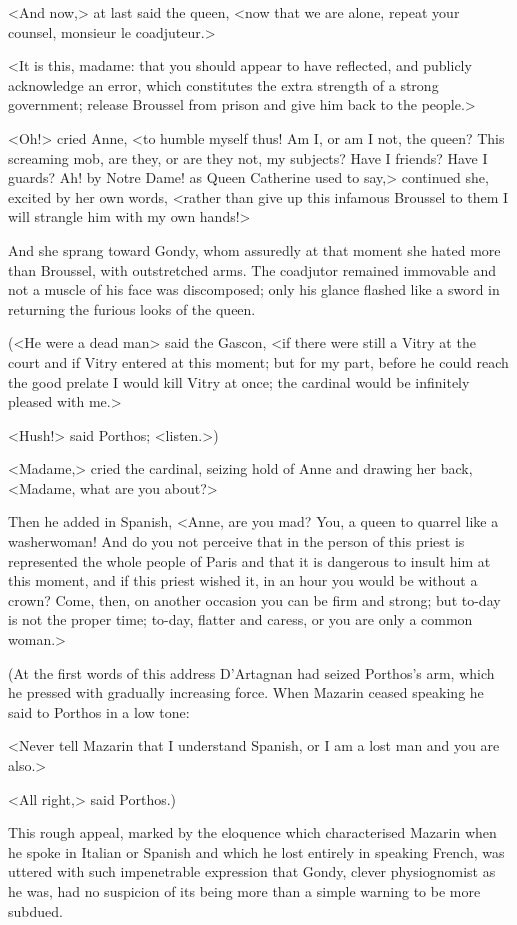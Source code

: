 <And now,> at last said the queen, <now that we are alone, repeat your counsel, monsieur le coadjuteur.>

<It is this, madame: that you should appear to have reflected, and publicly acknowledge an error, which constitutes the extra strength of a strong government; release Broussel from prison and give him back to the people.>

<Oh!> cried Anne, <to humble myself thus! Am I, or am I not, the queen? This screaming mob, are they, or are they not, my subjects? Have I friends? Have I guards? Ah! by Notre Dame! as Queen Catherine used to say,> continued she, excited by her own words, <rather than give up this infamous Broussel to them I will strangle him with my own hands!>

And she sprang toward Gondy, whom assuredly at that moment she hated more than Broussel, with outstretched arms. The coadjutor remained immovable and not a muscle of his face was discomposed; only his glance flashed like a sword in returning the furious looks of the queen.

(<He were a dead man> said the Gascon, <if there were still a Vitry at the court and if Vitry entered at this moment; but for my part, before he could reach the good prelate I would kill Vitry at once; the cardinal would be infinitely pleased with me.>

<Hush!> said Porthos; <listen.>)

<Madame,> cried the cardinal, seizing hold of Anne and drawing her back, <Madame, what are you about?>

Then he added in Spanish, <Anne, are you mad? You, a queen to quarrel like a washerwoman! And do you not perceive that in the person of this priest is represented the whole people of Paris and that it is dangerous to insult him at this moment, and if this priest wished it, in an hour you would be without a crown? Come, then, on another occasion you can be firm and strong; but to-day is not the proper time; to-day, flatter and caress, or you are only a common woman.>

(At the first words of this address D'Artagnan had seized Porthos's arm, which he pressed with gradually increasing force. When Mazarin ceased speaking he said to Porthos in a low tone:

<Never tell Mazarin that I understand Spanish, or I am a lost man and you are also.>

<All right,> said Porthos.)

This rough appeal, marked by the eloquence which characterised Mazarin when he spoke in Italian or Spanish and which he lost entirely in speaking French, was uttered with such impenetrable expression that Gondy, clever physiognomist as he was, had no suspicion of its being more than a simple warning to be more subdued.

